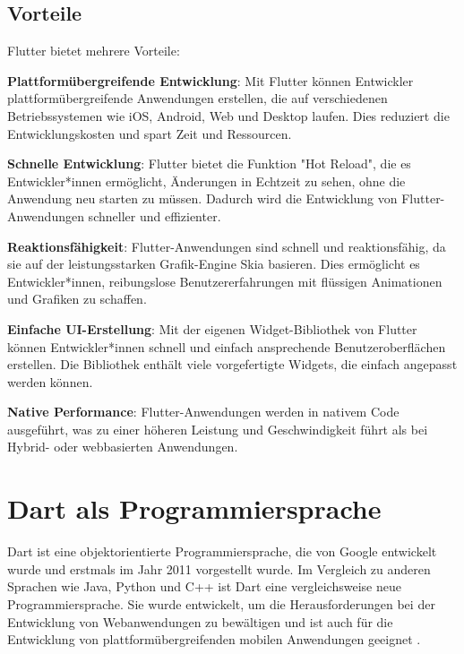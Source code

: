 \subsection{Vorteile}
Flutter bietet mehrere Vorteile:

\begin{compactitem}
    \item \textbf{Plattformübergreifende Entwicklung}: Mit Flutter können Entwickler plattformübergreifende Anwendungen erstellen, die auf verschiedenen Betriebssystemen wie iOS, 
    Android, Web und Desktop laufen. Dies reduziert die Entwicklungskosten und spart Zeit und Ressourcen.
    \item \textbf{Schnelle Entwicklung}: Flutter bietet die Funktion "Hot Reload", die es Entwickler*innen ermöglicht, Änderungen in Echtzeit zu sehen, 
    ohne die Anwendung neu starten zu müssen. Dadurch wird die Entwicklung von Flutter-Anwendungen schneller und effizienter.
    \item \textbf{Reaktionsfähigkeit}: Flutter-Anwendungen sind schnell und reaktionsfähig, da sie auf der leistungsstarken Grafik-Engine Skia basieren. 
    Dies ermöglicht es Entwickler*innen, reibungslose Benutzererfahrungen mit flüssigen Animationen und Grafiken zu schaffen.
    \item \textbf{Einfache UI-Erstellung}: Mit der eigenen Widget-Bibliothek von Flutter können Entwickler*innen schnell und einfach ansprechende Benutzeroberflächen erstellen. 
    Die Bibliothek enthält viele vorgefertigte Widgets, die einfach angepasst werden können.
    \item \textbf{Native Performance}: Flutter-Anwendungen werden in nativem Code ausgeführt, was zu einer höheren Leistung und Geschwindigkeit führt als bei Hybrid- oder webbasierten Anwendungen.
\end{compactitem}

\newpage
\section{Dart als Programmiersprache}
Dart ist eine objektorientierte Programmiersprache, die von Google entwickelt wurde und erstmals im Jahr 2011 vorgestellt wurde. Im Vergleich zu anderen Sprachen wie Java, Python und C++ ist Dart eine vergleichsweise neue Programmiersprache. Sie wurde entwickelt, um die Herausforderungen bei der Entwicklung von Webanwendungen zu bewältigen und ist auch für die Entwicklung von plattformübergreifenden mobilen Anwendungen geeignet \cite{aws-flutter}.

